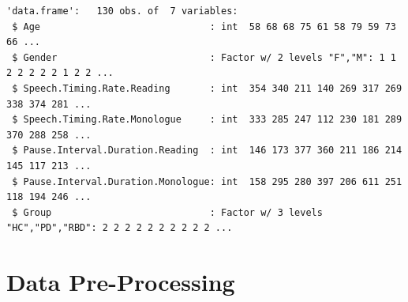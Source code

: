 \documentclass[
  english,
  doc,floatsintext]{apa6}
\begin{document}
\begin{table}[!htbp] \centering \renewcommand*{\arraystretch}{1.1}\caption{Summary of the Data Set used in this Analysis}\label{tab:summarize-data-frame}
\end{table}

\begin{verbatim}
'data.frame':   130 obs. of  7 variables:
 $ Age                              : int  58 68 68 75 61 58 79 59 73 66 ...
 $ Gender                           : Factor w/ 2 levels "F","M": 1 1 2 2 2 2 2 1 2 2 ...
 $ Speech.Timing.Rate.Reading       : int  354 340 211 140 269 317 269 338 374 281 ...
 $ Speech.Timing.Rate.Monologue     : int  333 285 247 112 230 181 289 370 288 258 ...
 $ Pause.Interval.Duration.Reading  : int  146 173 377 360 211 186 214 145 117 213 ...
 $ Pause.Interval.Duration.Monologue: int  158 295 280 397 206 611 251 118 194 246 ...
 $ Group                            : Factor w/ 3 levels "HC","PD","RBD": 2 2 2 2 2 2 2 2 2 2 ...
\end{verbatim}

\clearpage

\hypertarget{data-pre-processing}{%
\section{Data Pre-Processing}\label{data-pre-processing}}
\end{document}
